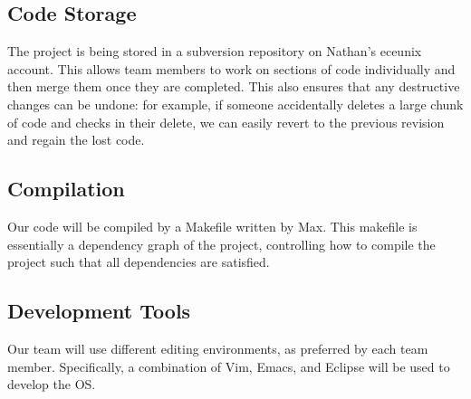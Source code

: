 \documentclass[titlepage]{article}
\begin{document}
\subsection{Code Storage}
The project is being stored in a subversion repository on Nathan's eceunix
account.  This allows team members to work on sections of code individually and
then merge them once they are completed.  This also ensures that any destructive
changes can be undone: for example, if someone accidentally deletes a large
chunk of code and checks in their delete, we can easily revert to the previous
revision and regain the lost code.

\subsection{Compilation}
Our code will be compiled by a Makefile written by Max.  This makefile is
essentially a dependency graph of the project, controlling how to compile the
project such that all dependencies are satisfied.

\subsection{Development Tools}
Our team will use different editing environments, as preferred by each team
member.  Specifically, a combination of Vim, Emacs, and Eclipse will be used to
develop the OS.
\end{document}
